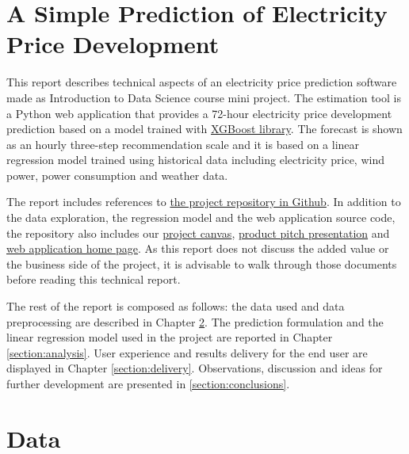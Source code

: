 \documentclass{article}
\begin{document}


\tableofcontents

\vspace{30.0 cm}

\section{A Simple Prediction of Electricity Price Development}
\label{section:introduction}

This report describes technical aspects of an electricity price prediction software made as Introduction to Data Science course mini project. The estimation tool is a Python web application that provides a 72-hour electricity price development prediction based on a model trained with \href{https://xgboost.ai/}{XGBoost library}. The forecast is shown as an hourly three-step recommendation scale and it is based on a linear regression model trained using historical data including electricity price, wind power, power consumption and weather data.

The report includes references to \href{https://github.com/IDS-mini/electricity}{the project repository in Github}. In addition to the data exploration, the regression model and the web application source code, the repository also includes our \href{https://github.com/IDS-mini/electricity/blob/main/marketing/Mini-Project-Canvas-Hedlund-Korpi-Ranta.pdf}{project canvas}, \href{https://github.com/IDS-mini/electricity/blob/main/marketing/presentation.pptx}{product pitch presentation} and \href{https://github.com/IDS-mini/electricity/blob/main/src/app/templates/index.html}{web application home page}. As this report does not discuss the added value or the business side of the project, it is advisable to walk through those documents before reading this technical report.

The rest of the report is composed as follows: the data used and data preprocessing are described in Chapter \ref{section:data}. The prediction formulation and the linear regression model used in the project are reported in Chapter \ref{section:analysis}. User experience and results delivery for the end user are displayed in Chapter \ref{section:delivery}. Observations, discussion and ideas for further development are presented in \ref{section:conclusions}.

\section{Data}
\label{section:data}
\end{document}
